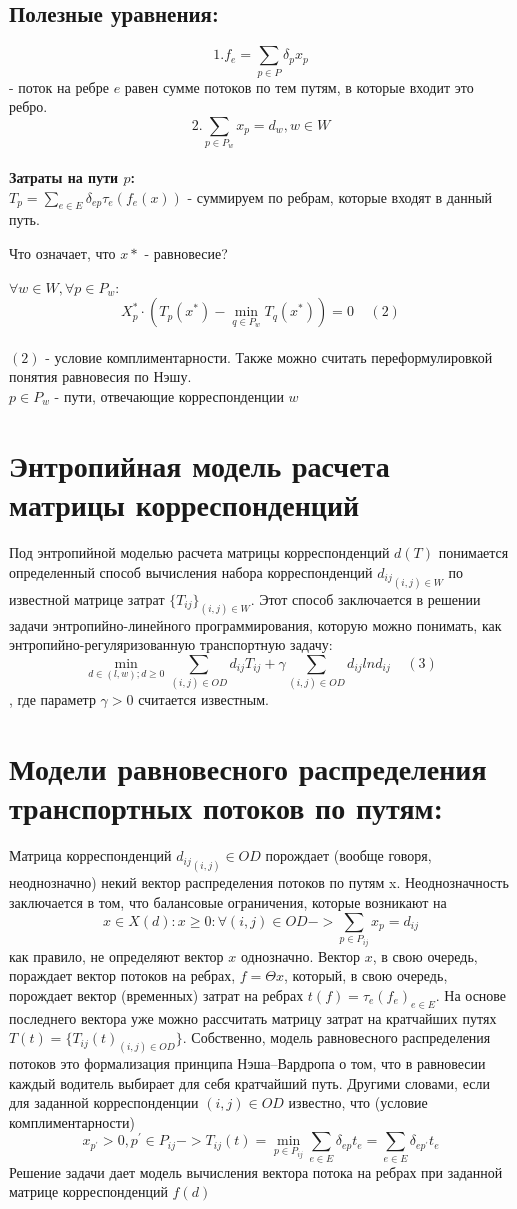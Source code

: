 \documentclass{article}
\begin{document}
\subsection{Полезные уравнения:}
$$1. f_e = \sum_{p \in P} \delta_{p} x_p$$ - поток на ребре $e$ равен сумме потоков по тем путям, в которые входит это ребро.
$$2. \sum_{p \in P_w} x_p = d_w, w \in W$$ \\

\textbf{Затраты на пути $p$:} \\
$T_p = \sum_{e \in E} \delta_{ep} \tau_e(f_e(x))$ - суммируем по ребрам, которые входят в данный путь.

Что означает, что $x*$ - равновесие?

$\forall w \in W, \forall p \in P_w$: $$X_p^* \cdot (T_p(x^*) - \min_{q \in P_w}T_q(x^*))=0  \;\;\;\; (2)$$  \\
$(2)$ - условие комплиментарности. Также можно считать переформулировкой понятия равновесия по Нэшу. \\
$p \in P_w$ - пути, отвечающие корреспонденции $w$

\section{Энтропийная модель расчета матрицы корреспонденций}
Под энтропийной моделью расчета матрицы корреспонденций $d(T)$ понимается определенный способ вычисления набора корреспонденций ${d_{ij}}_{(i,j)\in W}$ по известной матрице
затрат $\{T_{ij}\}_{(i,j) \in W}$. Этот способ заключается в решении задачи энтропийно-линейного программирования, которую можно понимать, как энтропийно-регуляризованную транспортную задачу:
$$\min_{d \in (l,w); d \ge 0} \sum_{(i,j) \in OD} d_{ij}T_{ij} + \gamma \sum_{(i,j) \in OD} d_{ij}lnd_{ij} \;\;\;\; (3)$$,
где параметр $\gamma > 0$ считается известным.

\section{Модели равновесного распределения транспортных потоков по путям:}
Матрица корреспонденций ${d_{ij}}_{(i,j)}\in OD$ порождает (вообще говоря, неоднозначно) некий вектор распределения потоков по путям x. Неоднозначность заключается в том, что балансовые ограничения, которые возникают на $$x \in X(d): x \ge 0 : \forall(i, j) \in OD -> \sum_{p \in P_{ij}} x_p = d_{ij}$$
как правило, не определяют вектор $x$ однозначно. Вектор $x$, в свою очередь, пораждает вектор потоков на ребрах, $f = \Theta x$, который, в свою очередь, порождает вектор (временных) затрат на ребрах $t(f) = {\tau_e(f_e)}_{e \in E}$. На основе последнего вектора уже можно рассчитать матрицу затрат на кратчайших путях $T(t) = \{T_{ij}(t)_{(i,j)\in OD}\}$. Собственно, модель равновесного распределения потоков это формализация принципа Нэша–Вардропа о том, что в равновесии каждый водитель выбирает для себя кратчайший путь. Другими словами, если для заданной корреспонденции $(i, j) \in OD$ известно, что (условие комплиментарности)
$$x_{p^{'}} > 0, p^{'} \in P_{ij} -> T_{ij}(t) = \min_{p \in P_{ij}} \sum_{e\in E}\delta_{ep}t_e = \sum_{e \in E} \delta_{ep^{'}}t_e $$
Решение задачи дает модель вычисления вектора потока на ребрах при заданной матрице корреспонденций $f(d)$
\end{document}

